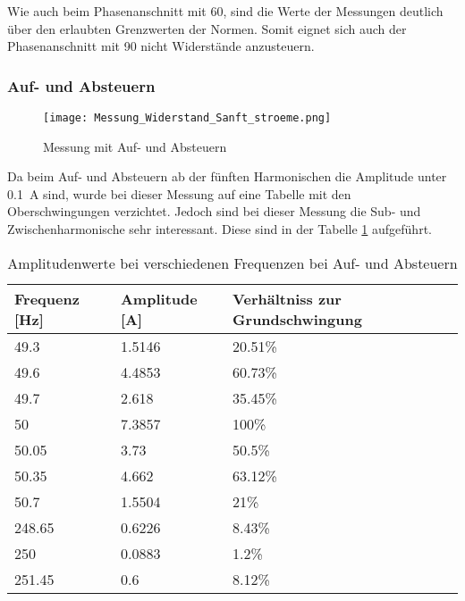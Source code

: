 Wie auch beim Phasenanschnitt mit 60\textdegree, sind die Werte der Messungen deutlich über den erlaubten Grenzwerten der Normen. Somit eignet sich auch der Phasenanschnitt mit 90\textdegree \hspace{0.02cm} nicht Widerstände anzusteuern. 



\newpage
\subsubsection*{Auf- und Absteuern}
\begin{figure}[ht!]
	\centering
	\texttt{[image: Messung\_Widerstand\_Sanft\_stroeme.png]}	
	\caption{Messung mit Auf- und Absteuern}\label{fig:Mess_Widerstand_Sanft_stroeme}
\end{figure}
Da beim Auf- und Absteuern ab der fünften Harmonischen die Amplitude unter \SI{0.1}{A} sind, wurde bei dieser Messung auf eine Tabelle mit den Oberschwingungen verzichtet. Jedoch sind bei dieser Messung die Sub- und Zwischenharmonische sehr interessant. Diese sind in der Tabelle \ref{tab:Sanft_stroeme} aufgeführt.

\begin{table}[ht!]
	\centering
	\begin{tabular}{|l|l|l|}
		\hline
		Frequenz {[}Hz{]} & Amplitude {[}A{]} & Verhältniss zur Grundschwingung	\\ \hline
		49.3              & 1.5146            & 20.51\%							\\ \hline
		49.6              & 4.4853            & 60.73\%							\\ \hline
		49.7              & 2.618             & 35.45\%							\\ \hline
		50                & 7.3857            & 100\%							\\ \hline
		50.05             & 3.73              & 50.5\%							\\ \hline
		50.35             & 4.662             & 63.12\%							\\ \hline
		50.7              & 1.5504            & 21\%							\\ \hline
		248.65            & 0.6226            & 8.43\%							\\ \hline
		250               & 0.0883            & 1.2\%							\\ \hline
		251.45            & 0.6               & 8.12\%							\\ \hline
	\end{tabular}
	\caption{Amplitudenwerte bei verschiedenen Frequenzen bei Auf- und Absteuern}\label{tab:Sanft_stroeme}
\end{table}

